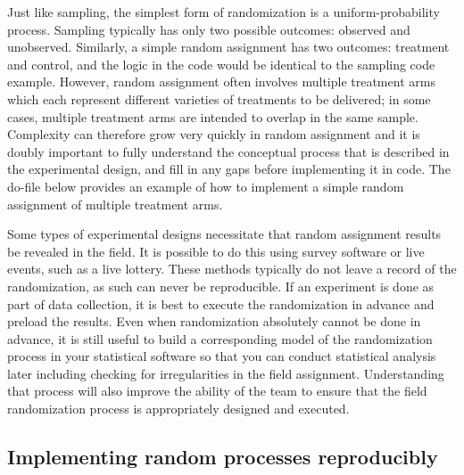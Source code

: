 Just like sampling, the simplest form of randomization
is a uniform-probability process.
Sampling typically has only two possible outcomes: observed and unobserved.
Similarly, a simple random assignment has two outcomes: treatment and control,
and the logic in the code would be identical to the sampling code example.
However, random assignment often involves multiple treatment arms
which each represent different varieties of treatments to be delivered;
in some cases, multiple treatment arms are intended to overlap in the same sample.
Complexity can therefore grow very quickly in random assignment
and it is doubly important to fully understand the conceptual process
that is described in the experimental design,
and fill in any gaps before implementing it in code.
The do-file below provides an example of how to implement
a simple random assignment of multiple treatment arms.


Some types of experimental designs necessitate
that random assignment results be revealed in the field.
It is possible to do this using survey software or live events, such as a live lottery.
These methods typically do not leave a record of the randomization,
as such can never be reproducible. If an experiment is done as part of data collection,
it is best to execute the randomization in advance and preload the results.
Even when randomization absolutely cannot be done in advance, it is still useful
to build a corresponding model of the randomization process in your statistical software
so that you can conduct statistical analysis later
including checking for irregularities in the field assignment.
Understanding that process will also improve the ability of the team
to ensure that the field randomization process is appropriately designed and executed.


\subsection{Implementing random processes reproducibly}

